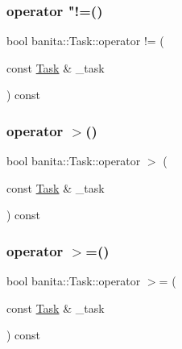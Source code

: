 \mbox{\label{classbanita_1_1_task_a475f0812eff764bef68edefc3893df67}} 
\subsubsection{\texorpdfstring{operator "!=()}{operator !=()}}
{\footnotesize\ttfamily bool banita\+::\+Task\+::operator != (\begin{DoxyParamCaption}\item[{const \mbox{\hyperlink{classbanita_1_1_task}{Task}} \&}]{\+\_\+task }\end{DoxyParamCaption}) const\hspace{0.3cm}{\ttfamily [inline]}}

\mbox{\label{classbanita_1_1_task_a2d5f75c11032d7b6a7c4e0697d4434b1}} 
\subsubsection{\texorpdfstring{operator $>$()}{operator >()}}
{\footnotesize\ttfamily bool banita\+::\+Task\+::operator $>$ (\begin{DoxyParamCaption}\item[{const \mbox{\hyperlink{classbanita_1_1_task}{Task}} \&}]{\+\_\+task }\end{DoxyParamCaption}) const\hspace{0.3cm}{\ttfamily [inline]}}

\mbox{\label{classbanita_1_1_task_ae5392bebeb2c9c1e8c83ab1e48446f90}} 
\subsubsection{\texorpdfstring{operator $>$=()}{operator >=()}}
{\footnotesize\ttfamily bool banita\+::\+Task\+::operator $>$= (\begin{DoxyParamCaption}\item[{const \mbox{\hyperlink{classbanita_1_1_task}{Task}} \&}]{\+\_\+task }\end{DoxyParamCaption}) const\hspace{0.3cm}{\ttfamily [inline]}}

